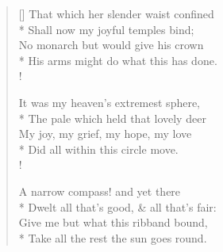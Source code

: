 \documentclass[MAIN]{subfiles}
\begin{document}
\settowidth{\versewidth}{That which her slender waist confined}
\begin{verse}[\versewidth]
That which her slender waist confined\\*
Shall now my joyful temples bind;\\
No monarch but would give his crown\\*
His arms might do what this has done.\\!

It was my heaven's extremest sphere,\\*
The pale which held that lovely deer\\
My joy, my grief, my hope, my love\\*
Did all within this circle move.\\!

A narrow compass! and yet there\\*
Dwelt all that's good, \& all that's fair:\\
Give me but what this ribband bound,\\*
Take all the rest the sun goes round.
\end{verse}
\end{document}
